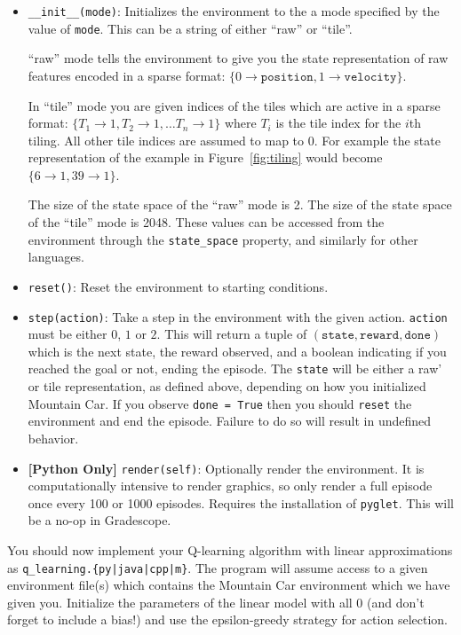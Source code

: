 \documentclass[11pt]{article}
\numberwithin{equation}{section} %
\numberwithin{figure}{section} %
\numberwithin{table}{section} %
\begin{document}
\begin{itemize}
    \item \texttt{\_\_init\_\_(mode)}: Initializes the environment to the a mode specified by the value of \texttt{mode}. This can be a string of either ``raw'' or ``tile''. 
    
    ``raw'' mode tells the environment to give you the state representation of raw features encoded in a sparse format: $\{0 \rightarrow \texttt{position}, 1 \rightarrow \texttt{velocity}\}$.
    
    In ``tile'' mode you are given indices of the tiles which are active in a sparse format: $\{T_1 \rightarrow 1, T_2 \rightarrow 1, \ldots T_n \rightarrow 1\}$ where $T_i$ is the tile index for the $i$th tiling. All other tile indices are assumed to map to 0. For example the state representation of the example in Figure~\ref{fig:tiling} would become $\{6 \rightarrow 1, 39 \rightarrow 1\}$.
    
    The size of the state space of the ``raw'' mode is 2. The size of the state space of the ``tile'' mode is 2048. These values can be accessed from the environment through the \texttt{state\_space} property, and similarly for other languages.
    \item \texttt{reset()}: Reset the environment to starting conditions.
    \item \texttt{step(action)}: Take a step in the environment with the given action. \texttt{action} must be either $0$, $1$ or $2$. This will return a tuple of $(\texttt{state}, \texttt{reward}, \texttt{done})$ which is the next state, the reward observed, and a boolean indicating if you reached the goal or not, ending the episode. The \texttt{state} will be either a raw' or tile representation, as defined above, depending on how you initialized Mountain Car.  If you observe \texttt{done = True} then you should \texttt{reset} the environment and end the episode. Failure to do so will result in undefined behavior.
    \item \textbf{[Python Only]} \texttt{render(self)}: Optionally render the environment. It is computationally intensive to render graphics, so only render a full episode once every 100 or 1000 episodes. Requires the installation of \texttt{pyglet}. This will be a no-op in Gradescope.
\end{itemize}

You should now implement your Q-learning algorithm with linear approximations as \newline\texttt{q\_learning.\{py|java|cpp|m\}}. The program will assume access to a given environment file(s) which contains the Mountain Car environment which we have given you. Initialize the parameters of the linear model with all 0 (and don't forget to include a bias!) and use the epsilon-greedy strategy for action selection.
\end{document}
